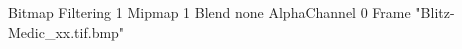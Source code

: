 {Bitmap
	{Filtering 1}
	{Mipmap 1}
	{Blend none}
	{AlphaChannel 0}
	{Frame "Blitz-Medic_xx.tif.bmp"}
}
